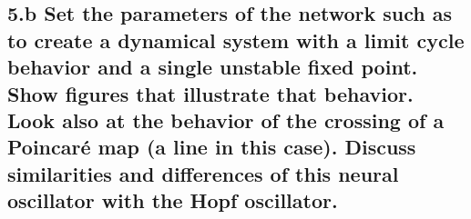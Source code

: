 \documentclass{cmc}
\begin{document}
\begin{figure}[H]
\begin{subfigure}[b]{0.49\textwidth}
{      \label{fig:pendulum-basic-phase}
    }
    \caption{}
  \end{subfigure}
  \caption{}
  \label{fig:two-stabe-one-fix}
\end{figure}


\subsection*{5.b Set the parameters of the network such as to create a dynamical
  system with a limit cycle behavior and a single unstable fixed point. Show
  figures that illustrate that behavior. Look also at the behavior of the
  crossing of a Poincaré map (a line in this case). Discuss similarities and
  differences of this neural oscillator with the Hopf oscillator.}
\end{document}
